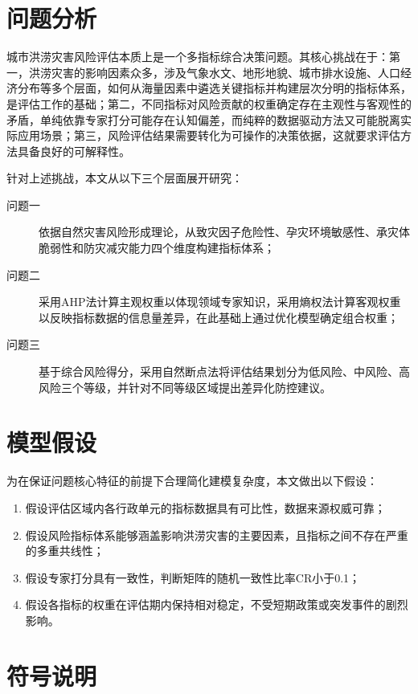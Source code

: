 \documentclass[12pt]{article}
\begin{document}
\section{问题分析}
城市洪涝灾害风险评估本质上是一个多指标综合决策问题。其核心挑战在于：第一，洪涝灾害的影响因素众多，涉及气象水文、地形地貌、城市排水设施、人口经济分布等多个层面，如何从海量因素中遴选关键指标并构建层次分明的指标体系，是评估工作的基础；第二，不同指标对风险贡献的权重确定存在主观性与客观性的矛盾，单纯依靠专家打分可能存在认知偏差，而纯粹的数据驱动方法又可能脱离实际应用场景；第三，风险评估结果需要转化为可操作的决策依据，这就要求评估方法具备良好的可解释性。

针对上述挑战，本文从以下三个层面展开研究：

\begin{description}
    \item[问题一] 依据自然灾害风险形成理论，从致灾因子危险性、孕灾环境敏感性、承灾体脆弱性和防灾减灾能力四个维度构建指标体系；
    \item[问题二] 采用AHP法计算主观权重以体现领域专家知识，采用熵权法计算客观权重以反映指标数据的信息量差异，在此基础上通过优化模型确定组合权重；
    \item[问题三] 基于综合风险得分，采用自然断点法将评估结果划分为低风险、中风险、高风险三个等级，并针对不同等级区域提出差异化防控建议。
\end{description}

\section{模型假设}

为在保证问题核心特征的前提下合理简化建模复杂度，本文做出以下假设：

\begin{enumerate}[label=假设\arabic*:,align=left]
    \item 假设评估区域内各行政单元的指标数据具有可比性，数据来源权威可靠；
    \item 假设风险指标体系能够涵盖影响洪涝灾害的主要因素，且指标之间不存在严重的多重共线性；
    \item 假设专家打分具有一致性，判断矩阵的随机一致性比率CR小于0.1；
    \item 假设各指标的权重在评估期内保持相对稳定，不受短期政策或突发事件的剧烈影响。
\end{enumerate}

\section{符号说明}
\end{document}
